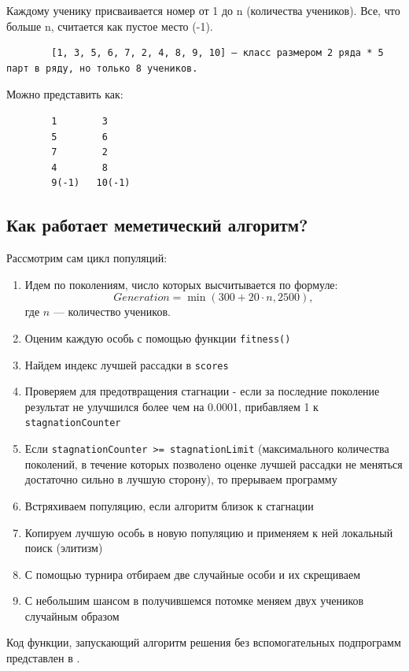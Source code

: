 \documentclass[12pt,a4paper]{extarticle} %
\begin{document}
	Каждому ученику присваивается номер от 1 до n (количества учеников). Все, что больше n, считается как пустое место (-1).
	
	\begin{verbatim}
		[1, 3, 5, 6, 7, 2, 4, 8, 9, 10] — класс размером 2 ряда * 5 парт в ряду, но только 8 учеников.
	\end{verbatim}
	
	Можно представить как:
	
	\begin{verbatim}
		1        3
		5        6
		7        2
		4        8
		9(-1)   10(-1)
	\end{verbatim}
	
	\subsection{Как работает меметический алгоритм?}
	Рассмотрим сам цикл популяций:
	
	\begin{enumerate}
		\item Идем по поколениям, число которых высчитывается по формуле:
		\begin{equation}
			Generation = \min(300 + 20 \cdot n, 2500),
		\end{equation}
		где $n$ --- количество учеников.
		\item Оценим каждую особь с помощью функции \texttt{fitness()}
		\item Найдем индекс лучшей рассадки в \texttt{scores}
		\item Проверяем для предотвращения стагнации - если за последние поколение результат не улучшился более чем на 0.0001, прибавляем 1 к \texttt{stagnationCounter}
		\item Если \texttt{stagnationCounter >= stagnationLimit} (максимального количества поколений, в течение которых позволено оценке лучшей рассадки не меняться достаточно сильно в лучшую сторону), то прерываем программу
		\item Встряхиваем популяцию, если алгоритм близок к стагнации
		\item Копируем лучшую особь в новую популяцию и применяем к ней локальный поиск (элитизм)
		\item С помощью турнира отбираем две случайные особи и их скрещиваем
		\item С небольшим шансом в получившемся потомке меняем двух учеников случайным образом
	\end{enumerate}
	
	Код функции, запускающий алгоритм решения без вспомогательных подпрограмм представлен в .
	
\end{document}
